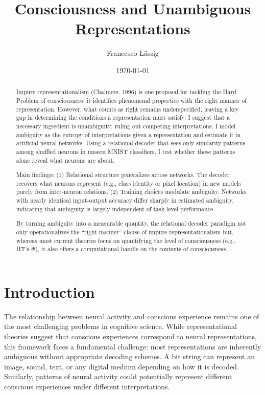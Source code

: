 \documentclass[11pt]{article}
\title{Consciousness and Unambiguous Representations}
\author{Francesco Lässig}
\date{\today}
\begin{document}
\maketitle

\begin{abstract}
Impure representationalism (Chalmers, 1996) is one proposal for tackling the Hard Problem of consciousness: it identifies phenomenal properties with the right manner of representation. However, what counts as right remains underspecified, leaving a key gap in determining the conditions a representation must satisfy. I suggest that a necessary ingredient is unambiguity: ruling out competing interpretations. I model ambiguity as the entropy of interpretations given a representation and estimate it in artificial neural networks. Using a relational decoder that sees only similarity patterns among shuffled neurons in unseen MNIST classifiers, I test whether these patterns alone reveal what neurons are about.

Main findings: (1) Relational structure generalizes across networks. The decoder recovers what neurons represent (e.g., class identity or pixel location) in new models purely from inter-neuron relations. (2) Training choices modulate ambiguity. Networks with nearly identical input-output accuracy differ sharply in estimated ambiguity, indicating that ambiguity is largely independent of task-level performance.

By turning ambiguity into a measurable quantity, the relational decoder paradigm not only operationalizes the ``right manner'' clause of impure representationalism but, whereas most current theories focus on quantifying the level of consciousness (e.g., IIT's $\Phi$), it also offers a computational handle on the contents of consciousness.
\end{abstract}

\section{Introduction}

The relationship between neural activity and conscious experience remains one of the most challenging problems in cognitive science. While representational theories suggest that conscious experiences correspond to neural representations, this framework faces a fundamental challenge: most representations are inherently ambiguous without appropriate decoding schemes. A bit string can represent an image, sound, text, or any digital medium depending on how it is decoded. Similarly, patterns of neural activity could potentially represent different conscious experiences under different interpretations.
\end{document}
